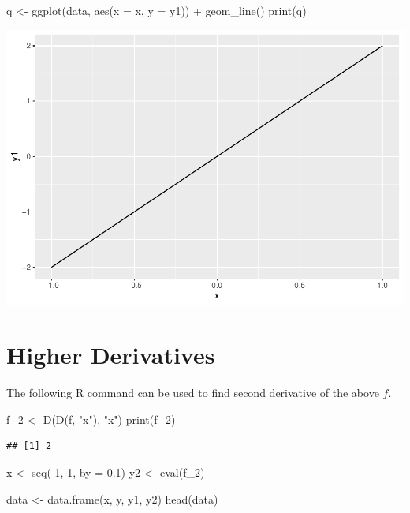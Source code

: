 \documentclass[
]{book}
\newenvironment{Shaded}{\begin{snugshade}}{\end{snugshade}}
\newcommand{\AttributeTok}[1]{\textcolor[rgb]{0.77,0.63,0.00}{#1}}
\newcommand{\DecValTok}[1]{\textcolor[rgb]{0.00,0.00,0.81}{#1}}
\newcommand{\FloatTok}[1]{\textcolor[rgb]{0.00,0.00,0.81}{#1}}
\newcommand{\FunctionTok}[1]{\textcolor[rgb]{0.00,0.00,0.00}{#1}}
\newcommand{\NormalTok}[1]{#1}
\newcommand{\OtherTok}[1]{\textcolor[rgb]{0.56,0.35,0.01}{#1}}
\newcommand{\SpecialCharTok}[1]{\textcolor[rgb]{0.00,0.00,0.00}{#1}}
\newcommand{\StringTok}[1]{\textcolor[rgb]{0.31,0.60,0.02}{#1}}
\begin{document}
\begin{Shaded}
\begin{Highlighting}[]
\NormalTok{q }\OtherTok{\textless{}{-}} \FunctionTok{ggplot}\NormalTok{(data, }\FunctionTok{aes}\NormalTok{(}\AttributeTok{x =}\NormalTok{ x, }\AttributeTok{y =}\NormalTok{ y1)) }\SpecialCharTok{+}
  \FunctionTok{geom\_line}\NormalTok{()}
\FunctionTok{print}\NormalTok{(q)}
\end{Highlighting}
\end{Shaded}

\includegraphics{bookdown-demo_files/figure-latex/unnamed-chunk-8-1.pdf}

\hypertarget{higher-derivatives}{%
\section{Higher Derivatives}\label{higher-derivatives}}

The following R command can be used to find second derivative of the above \(f\).

\begin{Shaded}
\begin{Highlighting}[]
\NormalTok{f\_2 }\OtherTok{\textless{}{-}} \FunctionTok{D}\NormalTok{(}\FunctionTok{D}\NormalTok{(f, }\StringTok{"x"}\NormalTok{), }\StringTok{"x"}\NormalTok{)}
\FunctionTok{print}\NormalTok{(f\_2)}
\end{Highlighting}
\end{Shaded}

\begin{verbatim}
## [1] 2
\end{verbatim}

\begin{Shaded}
\begin{Highlighting}[]
\NormalTok{x }\OtherTok{\textless{}{-}} \FunctionTok{seq}\NormalTok{(}\SpecialCharTok{{-}}\DecValTok{1}\NormalTok{, }\DecValTok{1}\NormalTok{, }\AttributeTok{by =} \FloatTok{0.1}\NormalTok{)}
\NormalTok{y2 }\OtherTok{\textless{}{-}} \FunctionTok{eval}\NormalTok{(f\_2)}

\NormalTok{data }\OtherTok{\textless{}{-}} \FunctionTok{data.frame}\NormalTok{(x, y, y1, y2)}
\FunctionTok{head}\NormalTok{(data)}
\end{Highlighting}
\end{Shaded}
\end{document}
